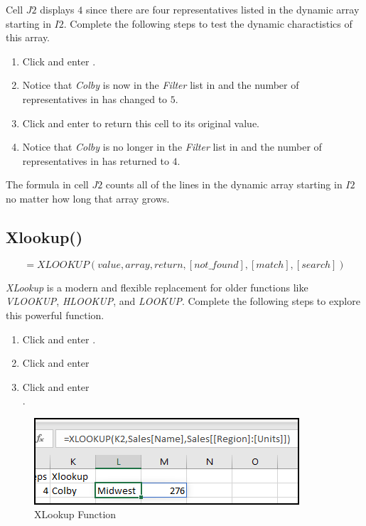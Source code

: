 Cell $ J2 $ displays $ 4 $ since there are four representatives listed in the dynamic array starting in $ I2 $. Complete the following steps to test the dynamic charactistics of this array.

\begin{enumbox}
	\begin{enumerate}
		\item Click  and enter .
		\item Notice that \textit{Colby} is now in the \textit{Filter} list in  and the number of representatives in  has changed to $ 5 $.
		\item Click  and enter  to return this cell to its original value.
		\item Notice that \textit{Colby} is no longer in the \textit{Filter} list in  and the number of representatives in  has returned to $ 4 $.
	\end{enumerate}
\end{enumbox}

The formula in cell $ J2 $ counts all of the lines in the dynamic array starting in $ I2 $ no matter how long that array grows.

\subsection{Xlookup()}

\[ =XLOOKUP(value, array, return, [not\_found], [match], [search]) \]

\textit{XLookup} is a modern and flexible replacement for older functions like \textit{VLOOKUP}, \textit{HLOOKUP}, and \textit{LOOKUP}. Complete the following steps to explore this powerful function.

\begin{enumbox}
	\begin{enumerate}
		\item Click  and enter .
		\item Click  and enter 
		\item Click  and enter \\ .
	\end{enumerate}
\end{enumbox}

\begin{figure}[H]
	\centering
	\includegraphics[width=\maxwidth{.75\linewidth}]{gfx/apb_fig05}
	\caption{XLookup Function}
	\label{apb:fig05}
\end{figure}

